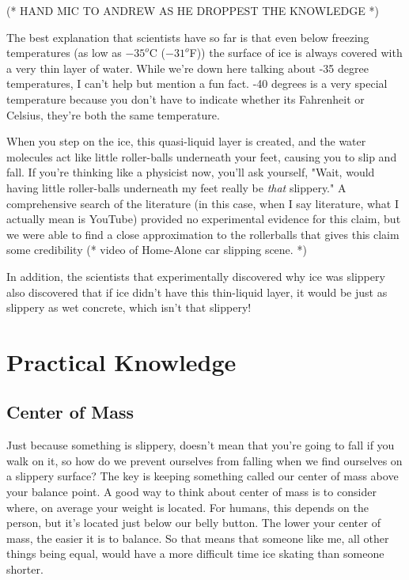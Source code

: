 \documentclass[12pt]{article}
\begin{document}
(* HAND MIC TO ANDREW AS HE DROPPEST THE KNOWLEDGE *)

The best explanation that scientists have so far is that even below freezing 
temperatures (as low as $-35^o$C ($-31^{o}$F)) the surface of ice is always 
covered with a very thin layer of water. While we're down here talking about 
-35 degree temperatures, I can't help but mention a fun fact. -40 degrees is a 
very special temperature because you don't have to indicate whether its 
Fahrenheit or Celsius, they're both the same temperature. 

When you step on the ice,  this quasi-liquid layer is created, and the
water molecules 
act like little roller-balls underneath your feet, causing you to slip and fall. 
If you're thinking like a physicist now, you'll ask yourself, "Wait, would having
little roller-balls underneath my feet really be \emph{that} slippery." A 
comprehensive search of the literature (in this case, when I say literature, 
what I actually mean is YouTube) provided no experimental 
evidence for this claim, but we were able to find a close approximation to 
the rollerballs that gives this claim some credibility (* video of Home-Alone
car slipping scene. *) 

In addition, the scientists that experimentally discovered why ice was slippery 
also discovered that if ice didn't have this thin-liquid layer, it would be 
just as slippery as wet concrete, which 
isn't that slippery!

\section{Practical Knowledge}

\subsection{Center of Mass}
Just because something is slippery, doesn't mean that you're going to 
fall if you walk on it, so how do we prevent ourselves from falling 
when we find ourselves on a slippery surface? The key is keeping 
something called our center of mass above your balance point. A good
way to think about center of mass is to consider where, on average
your weight is located.  For humans, this depends on the person,
but it's located just below our belly button. The lower your center
of mass, the easier it is to balance. So that means that someone
like me, all other things being equal, would have a more difficult
time ice skating than someone shorter. 
\end{document}
